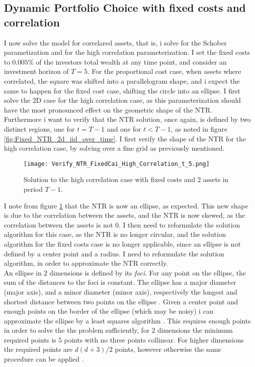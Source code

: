 \documentclass[11pt]{article}
\begin{document}
\subsection{Dynamic Portfolio Choice with fixed costs and correlation}
I now solve the model for correlared assets, that is, i solve for the Schober parametization and for the high correlation parameterization.
I set the fixed costs to $0.005\%$ of the investors total wealth at any time point, and consider an investment horizon of $T = 5$.
For the proportional cost case, when assets where correlated, the square was shifted into a parallelogram shape, and i expect the same to happen for the fixed cost case,
shifting the circle into an ellipse. I first solve the $2$D case for the high correlation case, as this parameterization 
should have the most pronounced effect on the geometric shape of the \ac{NTR}. Furthermore i want to verify that the \ac{NTR} solution,
once again, is defined by two distinct regions, one for $t = T-1$ and one for $t < T-1$, as noted in figure \ref{fig:Fixed_NTR_2d_iid_over_time}.
I first verify the shape of the NTR for the high correlation case, by solving over a fine grid as previously mentioned.

\begin{figure}[!ht]
    \centering
    \texttt{[image: Verify\_NTR\_FixedCai\_High\_Correlation\_t\_5.png]}
    \caption{Solution to the high correlation case with fixed costs and 2 assets in period $T-1$.}
    \label{fig:NTR_Verify_High_Correlation}
\end{figure}

I note from figure \ref{fig:NTR_Verify_High_Correlation} that the NTR is now an ellipse, as expected.
This new shape is due to the correlation between the assets, and the NTR is now skewed, as the correlation between the assets is not $0$.
I then need to reformulate the solution algorithm for this case, as the NTR is no longer circular, and the solution algorithm for the fixed costs case is no longer applicable,
since an ellipse is not defined by a center point and a radius. I need to reformulate the solution algorithm, in order to approximate the NTR correctly.\\
An ellipse in $2$ dimensions is defined by its \textit{foci}. For any point on the ellipse, the sum of the distances to the foci is constant.
The ellipse has a major diameter (major axis), and a minor diameter (minor axis), respectively the longest and shortest distance between two points on the ellipse
\autocite{Ivanov2020Ellipse}. Given a center point and enough points on the border of the ellipse (which may be noisy)
i can approximate the ellipse by a least squares algorithm \autocite{gander1994least}. This requires enough points in order to solve the the problem sufficiently,
for $2$ dimensions the minimum required points is $5$ points with no three points collinear. For higher dimensions the required points are $d(d+3)/2$ points,
however otherwise the same procedure can be applied \autocite{bertoni2010multi}.
\end{document}
